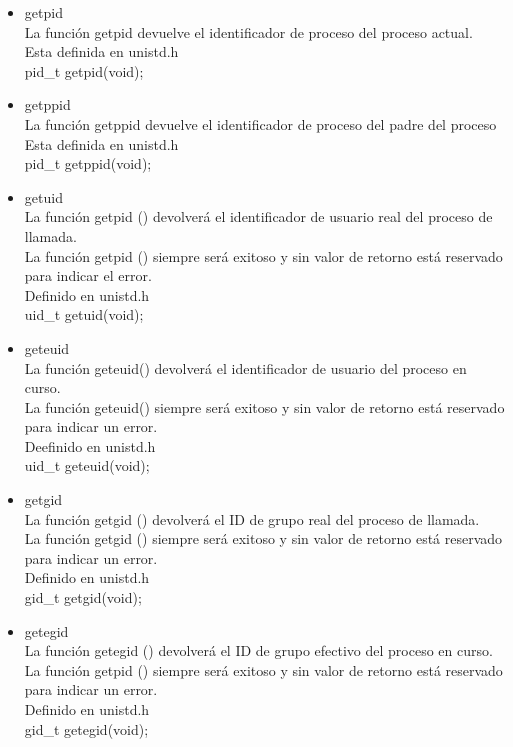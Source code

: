 	\begin{itemize}

		\item getpid\\ La función getpid devuelve el identificador de proceso del proceso actual.
		\\ Esta definida en unistd.h
		\\ pid\_t getpid(void);
		
		\item getppid
		\\ La función getppid devuelve el identificador de proceso del padre del proceso
		\\ Esta definida en unistd.h
		\\ pid\_t getppid(void);
		
		\item getuid
		\\ La función getpid () devolverá el identificador de usuario real del proceso de llamada.
		\\ La función getpid () siempre será exitoso y sin valor de retorno está reservado para indicar el error.
		\\ Definido en unistd.h
		\\ uid\_t getuid(void);
	
		\item geteuid
		\\ La función geteuid() devolverá el identificador de usuario del proceso en curso.
		\\ La función geteuid() siempre será exitoso y sin valor de retorno está reservado para indicar un error.
		\\ Deefinido en unistd.h
		\\ uid\_t geteuid(void);
		
		\item getgid
		\\ La función getgid () devolverá el ID de grupo real del proceso de llamada.
		\\ La función getgid () siempre será exitoso y sin valor de retorno está reservado para indicar un error.
		\\ Definido en unistd.h
		\\ gid\_t getgid(void); 
		
		\item getegid
		\\ La función getegid () devolverá el ID de grupo efectivo del proceso en curso.
		\\ La función getpid () siempre será exitoso y sin valor de retorno está reservado para indicar un error.
		\\ Definido en unistd.h
		\\ gid\_t getegid(void);
	\end{itemize}

